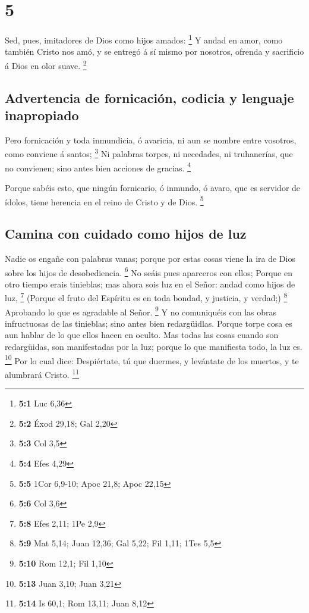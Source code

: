 \hypertarget{section-4}{%
\section{5}\label{section-4}}

 Sed, pues, imitadores de Dios como hijos amados:
\footnote{\textbf{5:1} Luc 6,36}  Y andad en amor, como
también Cristo nos amó, y se entregó á sí mismo por nosotros, ofrenda y
sacrificio á Dios en olor suave. \footnote{\textbf{5:2} Éxod 29,18; Gal
  2,20}

\hypertarget{advertencia-de-fornicaciuxf3n-codicia-y-lenguaje-inapropiado}{%
\subsection{Advertencia de fornicación, codicia y lenguaje
inapropiado}\label{advertencia-de-fornicaciuxf3n-codicia-y-lenguaje-inapropiado}}

 Pero fornicación y toda inmundicia, ó avaricia, ni aun se
nombre entre vosotros, como conviene á santos; \footnote{\textbf{5:3}
  Col 3,5}  Ni palabras torpes, ni necedades, ni
truhanerías, que no convienen; sino antes bien acciones de gracias.
\footnote{\textbf{5:4} Efes 4,29}

 Porque sabéis esto, que ningún fornicario, ó inmundo, ó
avaro, que es servidor de ídolos, tiene herencia en el reino de Cristo y
de Dios. \footnote{\textbf{5:5} 1Cor 6,9-10; Apoc 21,8; Apoc 22,15}

\hypertarget{camina-con-cuidado-como-hijos-de-luz}{%
\subsection{Camina con cuidado como hijos de
luz}\label{camina-con-cuidado-como-hijos-de-luz}}

 Nadie os engañe con palabras vanas; porque por estas
cosas viene la ira de Dios sobre los hijos de desobediencia. \footnote{\textbf{5:6}
  Col 3,6}  No seáis pues aparceros con ellos;
 Porque en otro tiempo erais tinieblas; mas ahora sois luz
en el Señor: andad como hijos de luz, \footnote{\textbf{5:8} Efes 2,11;
  1Pe 2,9}  (Porque el fruto del Espíritu es en toda
bondad, y justicia, y verdad;) \footnote{\textbf{5:9} Mat 5,14; Juan
  12,36; Gal 5,22; Fil 1,11; 1Tes 5,5}  Aprobando lo que
es agradable al Señor. \footnote{\textbf{5:10} Rom 12,1; Fil 1,10}
 Y no comuniquéis con las obras infructuosas de las
tinieblas; sino antes bien redargüidlas.  Porque torpe
cosa es aun hablar de lo que ellos hacen en oculto.  Mas
todas las cosas cuando son redargüidas, son manifestadas por la luz;
porque lo que manifiesta todo, la luz es. \footnote{\textbf{5:13} Juan
  3,10; Juan 3,21}  Por lo cual dice: Despiértate, tú que
duermes, y levántate de los muertos, y te alumbrará Cristo. \footnote{\textbf{5:14}
  Is 60,1; Rom 13,11; Juan 8,12}

